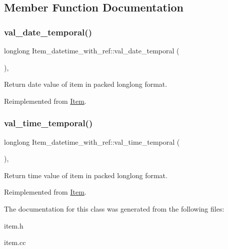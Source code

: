 \subsection{Member Function Documentation}
\mbox{\label{classItem__datetime__with__ref_acc643536450eae3ce88e244d70b8e3e5}} 
\subsubsection{\texorpdfstring{val\+\_\+date\+\_\+temporal()}{val\_date\_temporal()}}
{\footnotesize\ttfamily longlong Item\+\_\+datetime\+\_\+with\+\_\+ref\+::val\+\_\+date\+\_\+temporal (\begin{DoxyParamCaption}{ }\end{DoxyParamCaption})\hspace{0.3cm}{\ttfamily [inline]}, {\ttfamily [virtual]}}

Return date value of item in packed longlong format. 

Reimplemented from \mbox{\hyperlink{classItem_a9174217a46706eb2db74689b5365c4a5}{Item}}.

\mbox{\label{classItem__datetime__with__ref_ad4f0af48197792dcbd0ce0bbac488cbd}} 
\subsubsection{\texorpdfstring{val\+\_\+time\+\_\+temporal()}{val\_time\_temporal()}}
{\footnotesize\ttfamily longlong Item\+\_\+datetime\+\_\+with\+\_\+ref\+::val\+\_\+time\+\_\+temporal (\begin{DoxyParamCaption}{ }\end{DoxyParamCaption})\hspace{0.3cm}{\ttfamily [inline]}, {\ttfamily [virtual]}}

Return time value of item in packed longlong format. 

Reimplemented from \mbox{\hyperlink{classItem_a69ef60a3917a1bb4832498a695754c58}{Item}}.



The documentation for this class was generated from the following files\+:\begin{DoxyCompactItemize}
\item 
item.\+h\item 
item.\+cc\end{DoxyCompactItemize}
